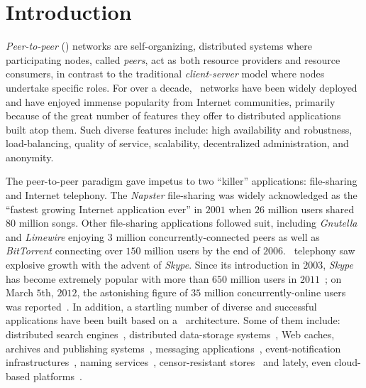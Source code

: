 \section{Introduction}
\label{section:intro}

\emph{Peer-to-peer} (\p) networks are self-organizing, distributed systems where
participating nodes, called \emph{peers}, act as both resource providers and
resource consumers, in contrast to the traditional \emph{client-server} model
where nodes undertake specific roles.
For over a decade, \p\ networks have been widely deployed and have
enjoyed immense popularity from Internet communities, primarily because
of the great number of features they offer to distributed applications 
built atop them. 
Such diverse features include:  high availability and robustness,
load-balancing, quality of service, scalability, decentralized administration,
and anonymity. 

The peer-to-peer paradigm gave impetus to two ``killer'' applications:
file-sharing and Internet telephony.
The {\sl Napster} file-sharing was widely acknowledged as the 
``fastest growing Internet application ever'' in $2001$ when
$26$ million users shared $80$ million songs.
Other file-sharing applications followed suit, 
including {\sl Gnutella} and {\sl Limewire} enjoying $3$ 
million concurrently-connected peers as well as 
{\sl BitTorrent} connecting over $150$ million users by the end of $2006$.
\p\ telephony saw explosive growth with the advent of {\sl Skype}.
Since its introduction in $2003$,
{\sl Skype} has become extremely popular with more than $650$ million users 
in $2011$~\cite{skypetotalusers}; on March $5$th, $2012$,  
the astonishing figure of $35$ million concurrently-online users  
was reported~\cite{skypesymusers}.
In addition, a startling number of diverse and successful
applications have been built based on a \p\ architecture. Some of them include:
distributed search engines~\cite{yaci}, 
distributed data-storage systems~\cite{kbc_oceanstore_2000,bdet_fsdfs_2000,dkkms_cfs_2001,dr_pastutility_2001,abc_farsite_2002,mmfc_ivy_2002,arla,agebh_dks_2003},
Web caches, archives and publishing systems~\cite{ird_squirrel_2002,bags_youserv_2002,wrc_publius_2000,wm_tangler_2001},
messaging applications~\cite{threedegrees}, 
event-notification infrastructures~\cite{rkcd_scribe_2001,cdkr_scribe_2002,agebh_dks_2003}, 
naming services~\cite{cmm_chorddns_2002}, 
censor-resistant stores~\cite{cswh_freenet_2001} and
lately, even cloud-based platforms~\cite{mgpj_cloudsnap_2011}.

